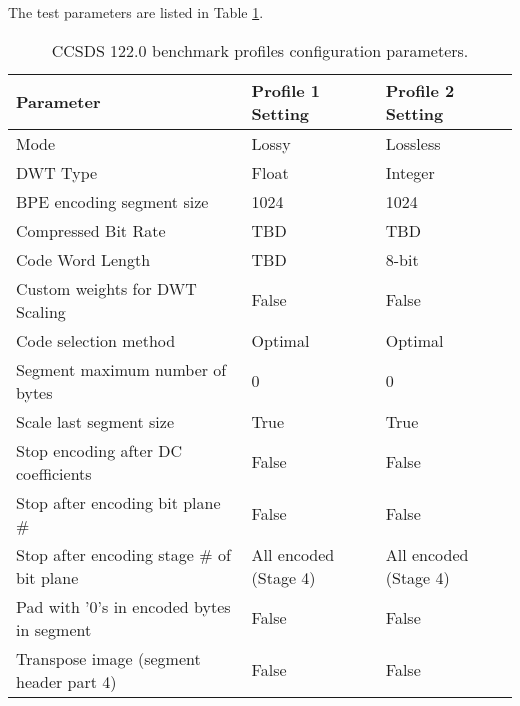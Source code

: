 The test parameters are listed in Table \ref{tab:ccsds122_params}.


\begin{table}[!h]
    \centering
    \begin{tabular}{|l|l|l|}
        \hline
        Parameter                                   & Profile 1	Setting     & Profile 2	Setting     \\ \hline
        \hline
        Mode                                        & Lossy                 & Lossless              \\ \hline
        DWT Type                                    & Float                 & Integer               \\ \hline 
		BPE encoding segment size                   & 1024                  & 1024                  \\ \hline
		Compressed Bit Rate                         & TBD                   & TBD                   \\ \hline
		Code Word Length                            & TBD                   & 8-bit                 \\ \hline
	    Custom weights for DWT Scaling              & False                 & False                 \\ \hline
		Code selection method                       & Optimal               & Optimal               \\ \hline
		Segment maximum number of bytes             & 0                     & 0                     \\ \hline
		Scale last segment size                     & True                  & True                  \\ \hline
		Stop encoding after DC coefficients         & False                 & False                 \\ \hline
		Stop after encoding bit plane \#            & False                 & False                 \\ \hline
		Stop after encoding stage \# of bit plane   & All encoded (Stage 4) & All encoded (Stage 4) \\ \hline
		Pad with '0's in encoded bytes in segment   & False                 & False                 \\ \hline
		Transpose image (segment header part 4)     & False                 & False                 \\ \hline
    \end{tabular}
    \caption{CCSDS 122.0 benchmark profiles configuration parameters.}
    \label{tab:ccsds122_params}
\end{table}

